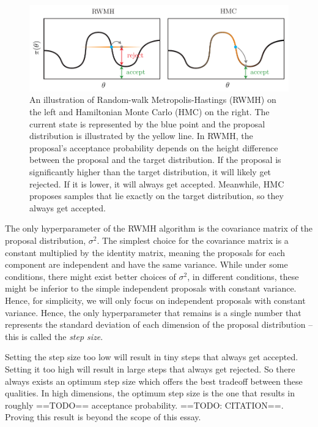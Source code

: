 \documentclass[12pt]{article}
\begin{document}
\begin{figure}[h]
\centering
\includegraphics[width=14cm]{illustrations/rwmh_vs_hmc.pdf}
\caption{An illustration of Random-walk Metropolis-Hastings (RWMH) on the left and Hamiltonian Monte Carlo (HMC) on the right. The current state is represented by the blue point and the proposal distribution is illustrated by the yellow line. In RWMH, the proposal's acceptance probability depends on the height difference between the proposal and the target distribution. If the proposal is significantly higher than the target distribution, it will likely get rejected. If it is lower, it will always get accepted. Meanwhile, HMC proposes samples that lie exactly on the target distribution, so they always get accepted.}
\label{fig_rwmh_vs_hmc}
\end{figure}

The only hyperparameter of the RWMH algorithm is the covariance matrix of the proposal distribution, $\sigma^2$. The simplest choice for the covariance matrix is a constant multiplied by the identity matrix, meaning the proposals for each component are independent and have the same variance. While under some conditions, there might exist better choices of $\sigma^2$, in different conditions, these might be inferior to the simple independent proposals with constant variance. Hence, for simplicity, we will only focus on independent proposals with constant variance. Hence, the only hyperparameter that remains is a single number that represents the standard deviation of each dimension of the proposal distribution -- this is called the \textit{step size}.

Setting the step size too low will result in tiny steps that always get accepted. Setting it too high will result in large steps that always get rejected. So there always exists an optimum step size which offers the best tradeoff between these qualities. In high dimensions, the optimum step size is the one that results in roughly ==TODO== acceptance probability. ==TODO: CITATION==. Proving this result is beyond the scope of this essay.
\end{document}
